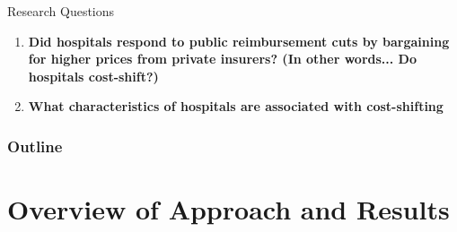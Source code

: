 \documentclass{beamer}
\begin{document}
\begin{frame}{Research Questions}
\begin{enumerate}
\item {\bf Did hospitals respond to public reimbursement cuts by bargaining for higher prices from private insurers? (In other words... Do hospitals cost-shift?)}
\item {\bf What characteristics of hospitals are associated with cost-shifting}
\end{enumerate}
\end{frame}

\begin{frame}
\frametitle{Outline} %
\tableofcontents %
\end{frame}


\section{Overview of Approach and Results}
\end{document}

